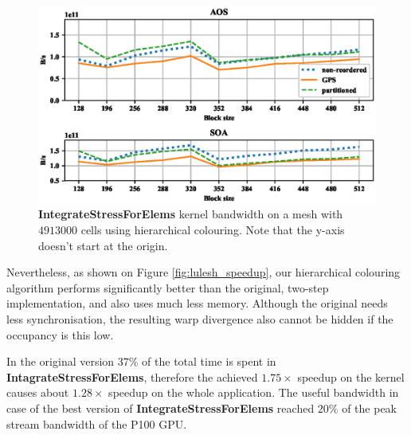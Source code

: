 \begin{figure}[Htbp]
  \centering
  \includegraphics[width=12cm]{fig/lulesh_bw-vs-bs_hier.eps}
  \caption{\textbf{IntegrateStressForElems} kernel bandwidth on a mesh with
  $4913000$ cells using hierarchical colouring. Note that the y-axis doesn't
  start at the origin.}
  \label{fig:lulesh_bw-vs-bs_hier}
\end{figure}

Nevertheless, as shown on Figure \ref{fig:lulesh_speedup}, our hierarchical
colouring algorithm performs significantly better than the original, two-step
implementation, and also uses much less memory. Although the original needs less
synchronisation, the resulting warp divergence also cannot be hidden if the
occupancy is this low.

In the original version $37\%$ of the total time is spent in
\textbf{IntagrateStressForElems}, therefore the achieved $1.75\times$ speedup on
the kernel causes about $1.28\times$ speedup on the whole application. The
useful bandwidth in case of the best version of \textbf{IntegrateStressForElems}
reached $20\%$ of the peak stream bandwidth of the P100 GPU.


